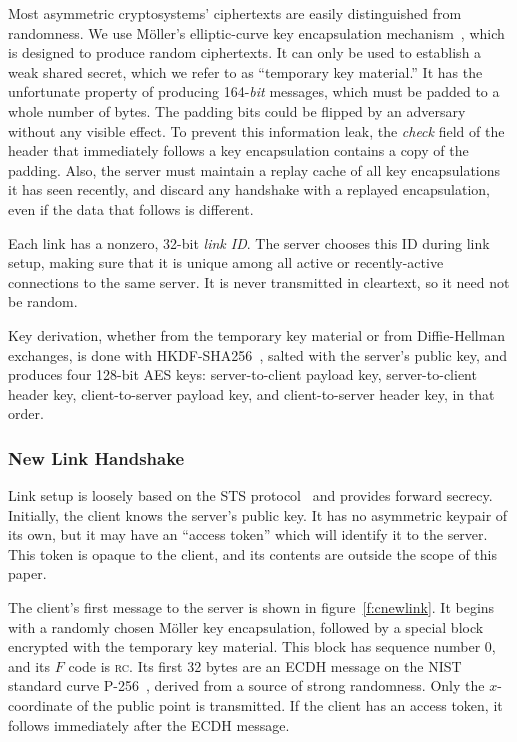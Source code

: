 Most asymmetric cryptosystems' ciphertexts are easily distinguished
from randomness. We use Möller's elliptic-curve key encapsulation
mechanism~\cite{s-moller}, which is designed to produce random
ciphertexts. It can only be used to establish a weak shared secret,
which we refer to as “temporary key material.”  It has the unfortunate
property of producing 164-\emph{bit} messages, which must be padded to
a whole number of bytes.  The padding bits could be flipped by an
adversary without any visible effect.  To prevent this information
leak, the \emph{check} field of the header that immediately follows a
key encapsulation contains a copy of the padding.  Also, the server
must maintain a replay cache of all key encapsulations it has seen
recently, and discard any handshake with a replayed encapsulation,
even if the data that follows is different.

Each link has a nonzero, 32-bit \emph{link ID}.  The server chooses
this ID during link setup, making sure that it is unique among all
active or recently-active connections to the same server.  It is never
transmitted in cleartext, so it need not be random.

Key derivation, whether from the temporary key material or from
Diffie-Hellman exchanges, is done with HKDF-SHA256~\cite{s-hkdf1},
salted with the server's public key, and produces four 128-bit AES
keys: server-to-client payload key, server-to-client header key,
client-to-server payload key, and client-to-server header key, in that
order.

\subsubsection{New Link Handshake}

Link setup is loosely based on the STS protocol~\cite{s-sts} and
provides forward secrecy.  Initially, the client knows the server's
public key.  It has no asymmetric keypair of its own, but it may have
an “access token” which will identify it to the server.  This token is
opaque to the client, and its contents are outside the scope of this
paper.

The client's first message to the server is shown in
figure~\ref{f:cnewlink}.  It begins with a randomly chosen Möller key
encapsulation, followed by a special block encrypted with the
temporary key material.  This block has sequence number 0, and its $F$
code is \textsc{rc}.  Its first 32 bytes are an ECDH message on the
NIST standard curve P-256~\cite{s-fips186-2}, derived from a source of
strong randomness.  Only the $x$-coordinate of the public point is
transmitted.  If the client has an access token, it follows
immediately after the ECDH message.

